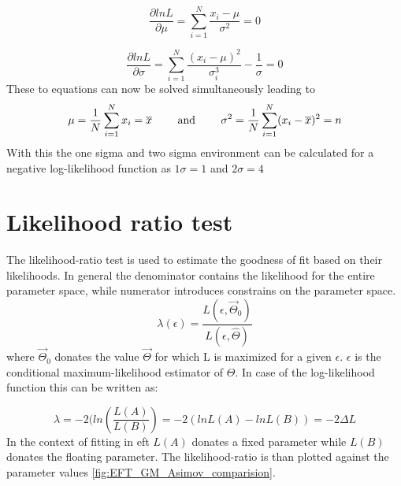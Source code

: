 \documentclass[../Bachelorarbeit.tex]{subfiles}
\begin{document}
\begin{equation}
    \frac{\partial ln L}{\partial \mu} = \sum_{i = 1}^{N} \frac{x_{i}-\mu}{\sigma^{2}} = 0
\end{equation}

\begin{equation}
    \frac{\partial ln L}{\partial \sigma} = \sum_{i = 1}^{N} \frac{(x_{i}-\mu)^{2}}{\sigma_{i}^{3}} - \frac{1}{\sigma} = 0
\end{equation}
These to equations can now be solved simultaneously leading to
\begin{equation}
    \mu = \frac{1}{N} \sum^{N}_{i = 1} x_{i} = \overline{x} \qquad \textnormal{ and } \qquad \sigma^{2} = \frac{1}{N} \sum^{N}_{i = 1} (x_{i}-\overline{x})^{2} = n
\end{equation}
With this the one si\acrshort{gm}a and two si\acrshort{gm}a environment can be calculated for a negative log-likelihood function as $1\sigma=1$ and $2\sigma=4$ \cite{Erdmann.2020}
\section{Likelihood ratio test}
The likelihood-ratio test is used to estimate the goodness of fit based on their likelihoods. In general the denominator contains the likelihood for the entire parameter space, while numerator introduces constrains on the parameter space.
\begin{equation}
    \lambda(\epsilon) = \frac{L(\epsilon,\overrightarrow{\Theta}_{0})}{L(\epsilon,\hat{\Theta})}
\end{equation}
where $\overrightarrow{\Theta}_{0}$ donates the value $\overrightarrow{\Theta}$ for which L is maximized for a given $\epsilon$. $\epsilon$ is the
conditional maximum-likelihood estimator of $\Theta$. In case of the log-likelihood function this can be written as:

\begin{equation}
    \lambda = -2(ln(\frac{L(A)}{L(B)})= -2(ln L(A)-ln L(B))=-2 \Delta L
\end{equation}
In the context of fitting in \acrshort{eft} $L(A)$ donates a fixed parameter while $L(B)$ donates the floating parameter. The likelihood-ratio is than plotted against the parameter values  \ref{fig:EFT_GM_Asimov_comparision}.
\end{document}
